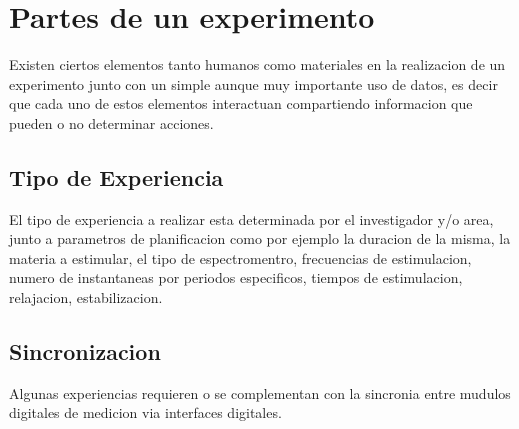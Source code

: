 \section{Partes de un experimento}

Existen ciertos elementos tanto humanos como materiales en la realizacion de un experimento junto con un 
simple aunque muy importante uso de datos, es decir que cada uno de estos elementos interactuan compartiendo
informacion que pueden o no determinar acciones.

\subsection{Tipo de Experiencia}
El tipo de experiencia a realizar esta determinada por el investigador y/o area, junto a parametros de planificacion
como por ejemplo la duracion de la misma, la materia a estimular, el tipo de espectromentro, frecuencias
de estimulacion, numero de instantaneas por periodos especificos, tiempos de estimulacion, relajacion, estabilizacion.

\subsection{Sincronizacion}
Algunas experiencias requieren o se complementan con la sincronia entre mudulos digitales de medicion via interfaces 
digitales.